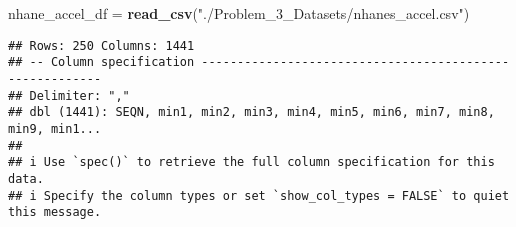 \documentclass[
]{article}
\newenvironment{Shaded}{\begin{snugshade}}{\end{snugshade}}
\newcommand{\FunctionTok}[1]{\textcolor[rgb]{0.13,0.29,0.53}{\textbf{#1}}}
\newcommand{\NormalTok}[1]{#1}
\newcommand{\OtherTok}[1]{\textcolor[rgb]{0.56,0.35,0.01}{#1}}
\newcommand{\StringTok}[1]{\textcolor[rgb]{0.31,0.60,0.02}{#1}}
\begin{document}
\begin{Shaded}
\begin{Highlighting}[]
\NormalTok{nhane\_accel\_df }\OtherTok{=} \FunctionTok{read\_csv}\NormalTok{(}\StringTok{"./Problem\_3\_Datasets/nhanes\_accel.csv"}\NormalTok{)}
\end{Highlighting}
\end{Shaded}

\begin{verbatim}
## Rows: 250 Columns: 1441
## -- Column specification --------------------------------------------------------
## Delimiter: ","
## dbl (1441): SEQN, min1, min2, min3, min4, min5, min6, min7, min8, min9, min1...
## 
## i Use `spec()` to retrieve the full column specification for this data.
## i Specify the column types or set `show_col_types = FALSE` to quiet this message.
\end{verbatim}
\end{document}
